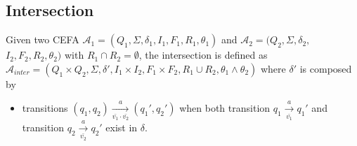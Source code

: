 \documentclass[sigconf]{acmart}
\newcommand*{\aut}{\mathcal{A}}
\begin{document}
\subsection{Intersection}\label{subsec:inter}
Given two CEFA $\aut_1 = (Q_1, \Sigma, \delta_1, I_1, F_1, R_1, \theta_1)$ and $\aut_2 = (Q_2, \Sigma, \delta_2,$ $I_2, F_2, R_2, \theta_2)$ with $R_1\cap R_2 = \emptyset$, the intersection is defined as $\aut_{inter} = (Q_1\times Q_2, \Sigma, \delta', I_1\times I_2, F_1\times F_2, R_1\cup R_2, \theta_1\wedge \theta_2)$ where $\delta'$ is composed by
\begin{itemize}
  \item transitions $(q_1,q_2)\xrightarrow[\bar{v_1}\cdot\bar{v_2}]{a} (q_1',q_2')$ when both transition $q_1\xrightarrow[\bar{v_1}]{a}q_1'$ and transition $q_2\xrightarrow[\bar{v_2}]{a}q_2'$ exist in $\delta$.
\end{itemize}
\end{document}
